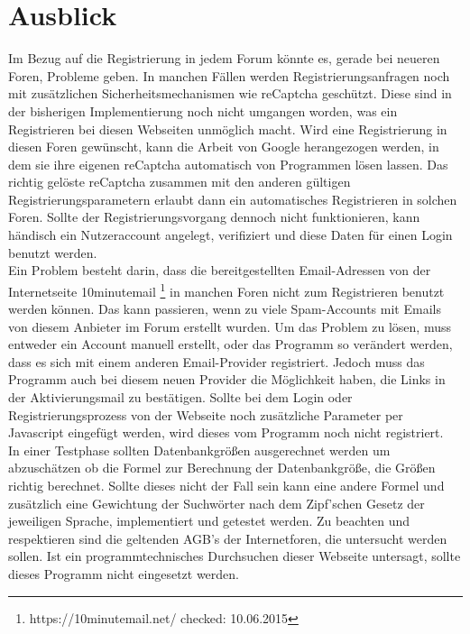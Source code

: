 \section{Ausblick}
Im Bezug auf die Registrierung in jedem Forum könnte es, gerade bei neueren Foren, Probleme geben. In manchen Fällen werden Registrierungsanfragen noch mit zusätzlichen Sicherheitsmechanismen wie reCaptcha geschützt. Diese sind in der bisherigen Implementierung noch nicht umgangen worden, was ein Registrieren bei diesen Webseiten unmöglich macht. Wird eine Registrierung in diesen Foren gewünscht, kann die Arbeit von Google herangezogen werden, in dem sie ihre eigenen reCaptcha automatisch von Programmen lösen lassen\cite{goodfellow2013multi}. Das richtig gelöste reCaptcha zusammen mit den anderen gültigen Registrierungsparametern erlaubt dann ein automatisches Registrieren in solchen Foren. Sollte der Registrierungsvorgang dennoch nicht funktionieren, kann händisch ein Nutzeraccount angelegt, verifiziert und diese Daten für einen Login benutzt werden.\\
Ein Problem besteht darin, dass die bereitgestellten Email-Adressen von der Internetseite 10minutemail \footnote{https://10minutemail.net/ checked: 10.06.2015} in manchen Foren nicht zum Registrieren benutzt werden können. Das kann passieren, wenn zu viele Spam-Accounts mit Emails von diesem Anbieter im Forum erstellt wurden. Um das Problem zu lösen, muss entweder ein Account manuell erstellt, oder das Programm so verändert werden, dass es sich mit einem anderen Email-Provider registriert. Jedoch muss das Programm auch bei diesem neuen Provider die Möglichkeit haben, die Links in der Aktivierungsmail zu bestätigen.
Sollte bei dem Login oder Registrierungsprozess von der Webseite noch zusätzliche Parameter per Javascript eingefügt werden, wird dieses vom Programm noch nicht registriert.\\
In einer Testphase sollten Datenbankgrößen ausgerechnet werden um abzuschätzen ob die Formel zur Berechnung der Datenbankgröße, die Größen richtig berechnet. Sollte dieses nicht der Fall sein kann eine andere Formel und zusätzlich eine Gewichtung der Suchwörter nach dem Zipf'schen Gesetz \cite{leopold2002zipfsche} der jeweiligen Sprache, implementiert und getestet werden\cite{jiang2009selectivity}.
Zu beachten und respektieren sind die geltenden AGB's der Internetforen, die untersucht werden sollen. Ist ein programmtechnisches Durchsuchen dieser Webseite untersagt, sollte dieses Programm nicht eingesetzt werden.

